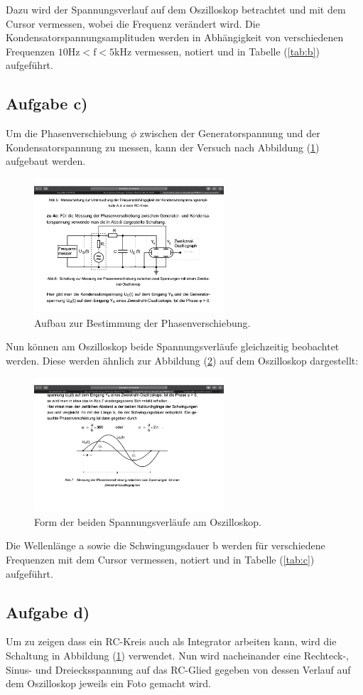 \noindent
Dazu wird der Spannungsverlauf auf dem Oszilloskop betrachtet und mit dem Cursor vermessen, wobei die Frequenz verändert wird.
Die Kondensatorspannungsamplituden werden in Abhängigkeit von verschiedenen Frequenzen $10\si{\hertz} < \text{f} < 5\si{\kilo\hertz}$ vermessen, notiert und in Tabelle (\ref{tab:b}) aufgeführt.

\subsection{Aufgabe c)}
Um die Phasenverschiebung $\phi$ zwischen der Generatorspannung und der Kondensatorspannung zu messen, kann der Versuch nach Abbildung (\ref{fig:rcac}) aufgebaut werden.

\newpage
\begin{figure}
            \centering
               \includegraphics[height=5cm]{rcac.pdf}
               \caption{Aufbau zur Bestimmung der Phasenverschiebung.}
               \label{fig:rcac}
\end{figure}

\noindent
Nun können am Oszilloskop beide Spannungsverläufe gleichzeitig beobachtet werden.
Diese werden ähnlich zur Abbildung (\ref{fig:rcac2}) auf dem Oszilloskop dargestellt:

\begin{figure}
            \centering
               \includegraphics[height=5cm]{rcac2.pdf}
               \caption{Form der beiden Spannungsverläufe am Oszilloskop.}
               \label{fig:rcac2}
\end{figure}

\noindent
Die Wellenlänge a sowie die Schwingungsdauer b werden für verschiedene Frequenzen mit dem Cursor vermessen, notiert und in Tabelle (\ref{tab:c}) aufgeführt. 

\subsection{Aufgabe d)}
Um zu zeigen dass ein RC-Kreis auch als Integrator arbeiten kann, wird die Schaltung in Abbildung (\ref{fig:rcac}) verwendet.
Nun wird nacheinander eine Rechteck-, Sinus- und Dreiecksspannung auf das RC-Glied gegeben von dessen Verlauf auf dem Oszilloskop jeweils ein Foto gemacht wird. 
